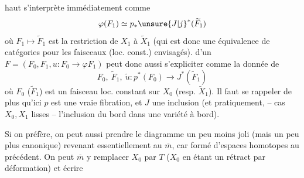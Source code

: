 %
haut s'interprète immédiatement comme
\[
\varphi(F_1)\simeq p_*{\unsure{J|j}}^*(\widetilde F_1)
\]
où $F_1\mapsto\widetilde F_1$ est la restriction de $X_1$ à $\widetilde X_1$ (qui
est donc une équivalence de catégories pour les
faisceaux (loc. const.) envisagés).  
d'un $F=(F_0,F_1,u:F_0\to\varphi F_1)$ peut donc aussi
s'expliciter comme la donnée de
\[
F_0,\ \widetilde F_1,\ \widetilde u:p^*(F_0)\longrightarrow J^*(\widetilde F_1)
\]
où $F_0$ ($\widetilde F_1$) est un faisceau loc. constant sur
$X_0$ (resp. $\widetilde X_1$). Il faut se rappeler de plus
qu'ici $p$ est une vraie fibration, et $J$ une inclusion
(et pratiquement, -- cas $X_0,X_1$ lisses --
 l'inclusion du bord dans une variété
à bord).

Si on préfère, on peut aussi prendre le
diagramme un peu moins joli (mais un
peu plus canonique)
revenant essentiellement au $\overline m$, car formé d'espaces
homotopes au précédent. On peut $\overline m$ y remplacer
$X_0$ par $T$ ($X_0$ en étant un rétract par déformation) et écrire
